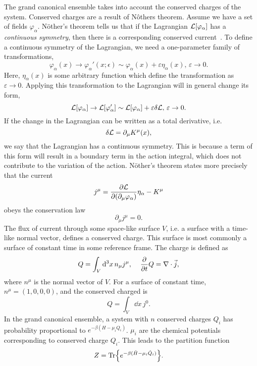 The grand canonical ensemble takes into account the conserved charges of the system.
Conserved charges are a result of Nôthers theorem.
Assume we have a set of fields $\varphi_\alpha$. Nöther's theorem tells us that if the Lagrangian $\mathcal{L}[\varphi_\alpha]$ has a \emph{continuous symmetry}, then there is a corresponding conserved current~\cite{Peskin:IntroQFT,Carroll:spacetime}.
To define a continuous symmetry of the Lagrangian, we need a one-parameter family of transformations,
\begin{equation*}
    \varphi_\alpha(x) \longrightarrow \varphi_\alpha'(x; \epsilon)
    \sim \varphi_\alpha(x) + \varepsilon \eta_\alpha(x), \, \varepsilon \rightarrow 0.
\end{equation*}
Here, $\eta_\alpha(x)$ is some arbitrary function which define the transformation as $\varepsilon \rightarrow 0$.
Applying this transformation to the Lagrangian will in general change its form,
\begin{equation*}
    \mathcal{L}[\varphi_\alpha] \rightarrow \mathcal{L}[\varphi_\alpha']
    \sim \mathcal{L}[\varphi_\alpha] + \varepsilon \delta \mathcal{L}, \,
    \varepsilon \rightarrow 0.
\end{equation*}
If the change in the Lagrangian can be written as a total derivative, i.e.
\begin{equation*}
    \delta \mathcal{L} = \partial_\mu K^\mu(x),
\end{equation*}
we say that the Lagrangian has a continuous symmetry.
This is because a term of this form will result in a boundary term in the action integral, which does not contribute to the variation of the action.
Nöther's theorem states more precisely that the current
\begin{equation}
    j^\mu = \pdv{\mathcal{L}}{(\partial_\mu \varphi_\alpha)} \eta_\alpha - K^\mu
\end{equation}
obeys the conservation law
\begin{equation}
    \partial_\mu j^\mu = 0.
\end{equation}
The flux of current through some space-like surface $V$, i.e. a surface with a time-like normal vector, defines a conserved charge. This surface is most commonly a surface of constant time in some reference frame. 
The charge is defined as
\begin{equation}
    Q = \int_V \dd^3 x\, n_\mu j^\mu, \quad \, \pdv{t} Q = \nabla \cdot \vec j,
\end{equation}
where $n^\mu$ is the normal vector of $V$.
For a surface of constant time, $n^\mu = (1, 0, 0, 0)$, and the conserved charged is
\begin{equation}
    Q = \int_V \dd x \, j^0.
\end{equation}
In the grand canonical ensemble, a system with $n$ conserved charges $Q_i$ has probability proportional to $e^{-\beta (H - \mu_i Q_i)}$.
$\mu_i$ are the chemical potentials corresponding to conserved charge $Q_i$.
This leads to the partition function
\begin{equation}
    Z = \Tr{e^{-\beta(\hat H - \mu_i \hat Q_i)}}.
\end{equation}


